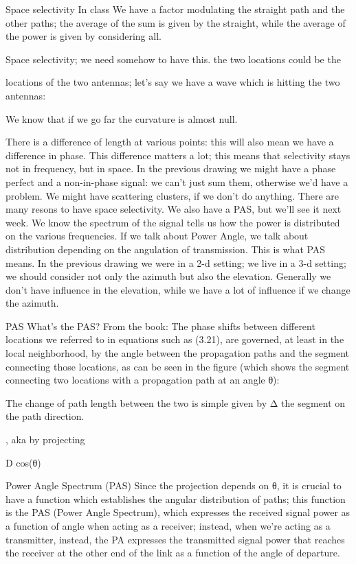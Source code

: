 {{{{Space selectivity In class We have a factor modulating the straight path and the other paths; the average of the sum is given by the straight, while the average of the power is given by considering all.

Space selectivity; we need somehow to have this. the two locations could be the

locations of the two antennas; let's say we have a wave which is hitting the two antennas:

We know that if we go far the curvature is almost null.

There is a difference of length at various points: this will also mean we have a difference in phase.
This difference matters a lot; this means that selectivity stays not in frequency, but in space.
In the previous drawing we might have a phase perfect and a non-in-phase signal:
we can't just sum them, otherwise we'd have a problem.
We might have scattering clusters, if we don't do anything.
There are many resons to have space selectivity. We also have a PAS, but we'll see it next week.
We know the spectrum of the signal tells us how the power is distributed on the various frequencies.
If we talk about Power Angle, we talk about distribution depending on the angulation of transmission. This is what PAS means.
In the previous drawing we were in a 2-d setting; we live in a 3-d setting; we should consider not only the azimuth but also the elevation.
Generally we don't have influence in the elevation, while we have a lot of influence if we change the azimuth.

PAS What's the PAS?
From the book:
The phase shifts between different locations we referred to in equations such as (3.21),
are governed, at least in the local neighborhood, by the angle between the propagation paths and the segment connecting those locations, as can be seen in the figure (which shows the segment connecting two locations with a propagation path at an angle θ):

The change of path length between the two is simple given by Δ the segment on the path direction.

, aka by projecting

D cos(θ)

Power Angle Spectrum (PAS)
Since the projection depends on θ, it is crucial to have a function which establishes the angular distribution of paths; this function is the PAS (Power Angle Spectrum),
which expresses the received signal power as a function of angle when acting as a receiver; instead, when we're acting as a transmitter, instead, the PA expresses the transmitted signal power that reaches the receiver at the other end of the link as a function of the angle of departure.

}}}}
